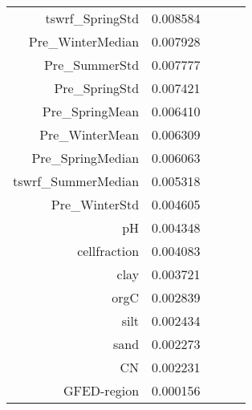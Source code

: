 \begin{tabular}{rrrrr}
tswrf_SpringStd & 0.008584 \\
Pre_WinterMedian & 0.007928 \\
Pre_SummerStd & 0.007777 \\
Pre_SpringStd & 0.007421 \\
Pre_SpringMean & 0.006410 \\
Pre_WinterMean & 0.006309 \\
Pre_SpringMedian & 0.006063 \\
tswrf_SummerMedian & 0.005318 \\
Pre_WinterStd & 0.004605 \\
pH & 0.004348 \\
cellfraction & 0.004083 \\
clay & 0.003721 \\
orgC & 0.002839 \\
silt & 0.002434 \\
sand & 0.002273 \\
CN & 0.002231 \\
GFED-region & 0.000156 \\
\bottomrule
\end{tabular}
